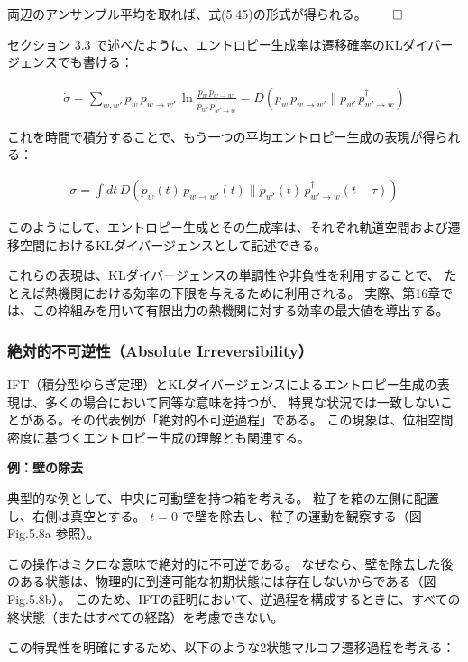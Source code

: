 \documentclass[a4paper,11pt]{jsarticle}
\numberwithin{equation}{section}
\begin{document}
両辺のアンサンブル平均を取れば、式(5.45)の形式が得られる。$\qed$

\bigskip

セクション 3.3 で述べたように、エントロピー生成率は遷移確率のKLダイバージェンスでも書ける：

\begin{align}
\dot{\sigma} 
= \sum_{w, w'} p_w\, p_{w \to w'}\, \ln \frac{p_w\, p_{w \to w'}}{p_{w'}\, p^†_{w' \to w}}
= D(p_w\, p_{w \to w'} \| p_{w'}\, p^†_{w' \to w})
\end{align}

これを時間で積分することで、もう一つの平均エントロピー生成の表現が得られる：

\begin{align}
\sigma = \int dt\, D(p_w(t)\, p_{w \to w'}(t) \| p_{w'}(t)\, p^†_{w' \to w}(t - \tau))
\end{align}

このようにして、エントロピー生成とその生成率は、それぞれ軌道空間および遷移空間におけるKLダイバージェンスとして記述できる。

これらの表現は、KLダイバージェンスの単調性や非負性を利用することで、
たとえば熱機関における効率の下限を与えるために利用される。
実際、第16章では、この枠組みを用いて有限出力の熱機関に対する効率の最大値を導出する。

\subsubsection{絶対的不可逆性（Absolute Irreversibility）}

IFT（積分型ゆらぎ定理）とKLダイバージェンスによるエントロピー生成の表現は、多くの場合において同等な意味を持つが、
特異な状況では一致しないことがある。その代表例が「絶対的不可逆過程」である。
この現象は、位相空間密度に基づくエントロピー生成の理解とも関連する。

\bigskip

\textbf{例：壁の除去}

典型的な例として、中央に可動壁を持つ箱を考える。
粒子を箱の左側に配置し、右側は真空とする。
$t = 0$ で壁を除去し、粒子の運動を観察する（図 Fig.5.8a 参照）。

この操作はミクロな意味で絶対的に不可逆である。
なぜなら、壁を除去した後のある状態は、物理的に到達可能な初期状態には存在しないからである（図 Fig.5.8b）。
このため、IFTの証明において、逆過程を構成するときに、すべての終状態（またはすべての経路）を考慮できない。

\bigskip

この特異性を明確にするため、以下のような2状態マルコフ遷移過程を考える：
\end{document}
